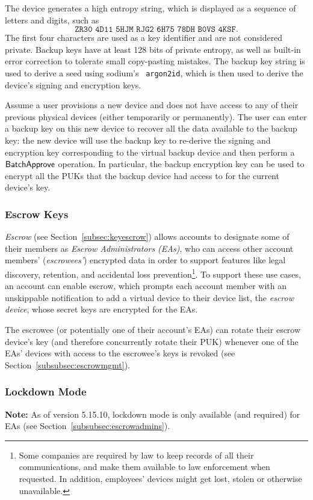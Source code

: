 The device generates a high entropy string, which is displayed as a sequence of letters and digits,
such as
%
\[ \texttt{ZR30 4D11 5HJM RJG2 6H75 78DH B0VS 4KSF}. \] 
%
The first four characters are used as a key identifier and are not considered private. Backup keys
have at least 128 bits of private entropy, as well as built-in error correction to tolerate small
copy-pasting mistakes. The backup key string is used to derive a seed using
sodium{}'s~\cite{libsodium} \texttt{argon2id}, which is then used to derive the device's signing and
encryption keys.

Assume a user provisions a new device and does not have access to any of their previous physical
devices (either temporarily or permanently). The user can enter a backup key on this new device to
recover all the data available to the backup key: the new device will use the backup key to
re-derive the signing and encryption key corresponding to the virtual backup device and then perform
a $\mathsf{BatchApprove}{}$ operation. In particular, the backup encryption key can be used to encrypt all
the PUKs that the backup device had access to for the current device's key.

\subsubsection{Escrow Keys}
\label{subsubsec:escrowkeys}
\emph{Escrow} (see Section~\ref{subsec:keyescrow}) allows accounts to designate some of their
members as \emph{Escrow Administrators (EAs)}, who can access other account members'
(\emph{escrowees'}) encrypted data in order to support features like legal discovery, retention, and
accidental loss prevention\footnote{Some companies are required by law to keep records of all their
communications, and make them available to law enforcement when requested. In addition, employees'
devices might get lost, stolen or otherwise unavailable.}. To support these use cases, an account
can enable escrow, which prompts each account member with an unskippable notification to add a
virtual device to their device list, the \emph{escrow device}, whose secret keys are encrypted for
the EAs.

The escrowee (or potentially one of their account's EAs) can rotate their escrow device's key (and
therefore concurrently rotate their PUK) whenever one of the EAs' devices with access to the
escrowee's keys is revoked (see Section~\ref{subsubsec:escrowmgmt}).

\subsubsection{Lockdown Mode}
\label{subsubsec:lockdownmode}
\textbf{Note:} As of version 5.15.10, lockdown mode is only available (and required) for EAs (see
Section~\ref{subsubsec:escrowadmins}).

